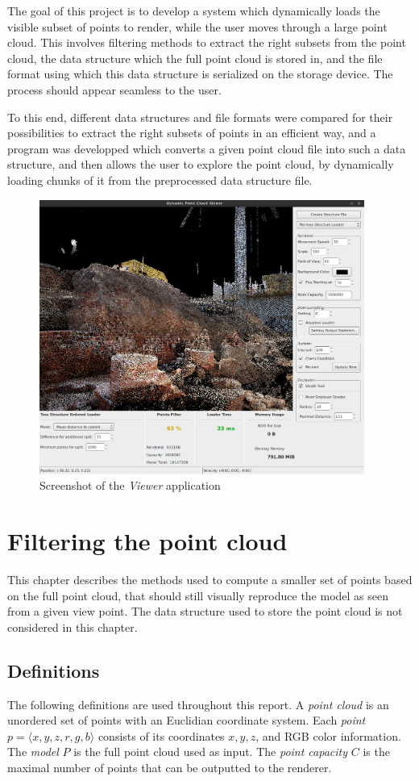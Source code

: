 \documentclass[a4paper,10pt,abstracton,notitlepage]{scrreprt}
\begin{document}
The goal of this project is to develop a system which dynamically loads the visible subset of points to render, while the user moves through a large point cloud. This involves filtering methods to extract the right subsets from the point cloud, the data structure which the full point cloud is stored in, and the file format using which this data structure is serialized on the storage device. The process should appear seamless to the user.

To this end, different data structures and file formats were compared for their possibilities to extract the right subsets of points in an efficient way, and a program was developped which converts a given point cloud file into such a data structure, and then allows the user to explore the point cloud, by dynamically loading chunks of it from the preprocessed data structure file.

\begin{figure}[H]
\centering
	\includegraphics[height=9cm]{screenshot.png}
	\caption{Screenshot of the \emph{Viewer} application}
\end{figure}



\chapter{Filtering the point cloud}
This chapter describes the methods used to compute a smaller set of points based on the full point cloud, that should still visually reproduce the model as seen from a given view point. The data structure used to store the point cloud is not considered in this chapter.

\section{Definitions}
The following definitions are used throughout this report. A \emph{point cloud} is an unordered set of points with an Euclidian coordinate system. Each \emph{point} $p = \langle x, y, z, r, g, b\rangle$ consists of its coordinates $x, y, z$, and RGB color information. The \emph{model} $P$ is the full point cloud used as input. The \emph{point capacity} $C$ is the maximal number of points that can be outputted to the renderer. 
\end{document}
